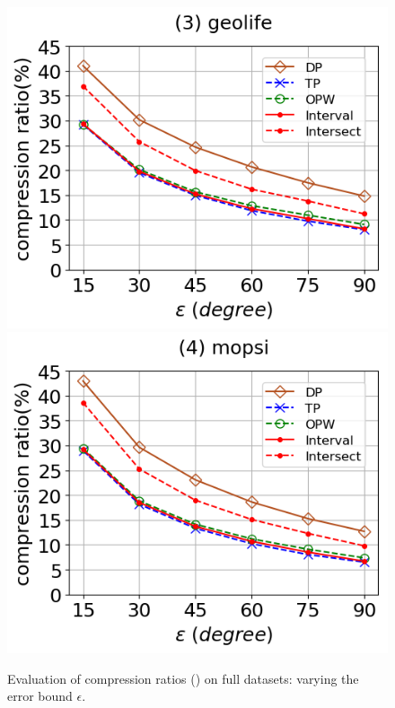 \begin{figure}[tb!]
	\includegraphics[scale=0.315]{Figures/Exp-DAD-CR-epsilon-geolife.png}	\hspace{1ex}
	\includegraphics[scale=0.315]{Figures/Exp-DAD-CR-epsilon-mopsi.png}		
	\vspace{-3ex}
	\caption{\small Evaluation of compression ratios (\dad) on full datasets: varying the error bound $\epsilon$.}
	\label{fig:cr-dad-epsilon}
	\vspace{-2ex}
\end{figure}


